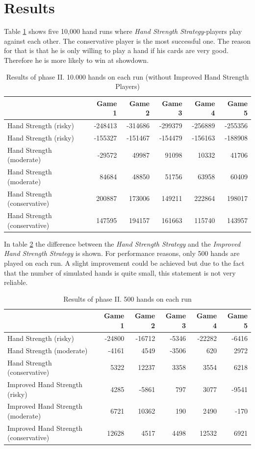 \section{Results}
Table \ref{tbl:resultsPhase2a} shows five 10,000 hand runs where \emph{Hand Strength Strategy}-players play against each other. The conservative player is the most successful one. The reason for that is that he is only willing to play a hand if his cards are very good. Therefore he is more likely to win at showdown.
\begin{table}[h]
	\centering
	\begin{tabular}[h]{l|r|r|r|r|r}
		& \textbf{Game 1} & \textbf{Game 2} & \textbf{Game 3} & \textbf{Game 4} & \textbf{Game 5}\\
		\hline
		Hand Strength (risky) & -248413 & -314686 & -299379 & -256889 & -255356\\
		Hand Strength (risky) & -155327 & -151467 & -154479 & -156163 & -188908\\
		Hand Strength (moderate) & -29572 & 49987 & 91098 & 10332 & 41706\\
		Hand Strength (moderate) & 84684 & 48850 & 51756 & 63958 & 60409\\
		Hand Strength (conservative) & 200887 & 173006 & 149211 & 222864 & 198017\\
		Hand Strength (conservative) & 147595 & 194157 & 161663 & 115740 & 143957\\
	\end{tabular}
	\caption{Results of phase II. 10.000 hands on each run (without Improved Hand Strength Players)}
	\label{tbl:resultsPhase2a}
\end{table}

In table \ref{tbl:resultsPhase2b} the difference between the \emph{Hand Strength Strategy} and the \emph{Improved Hand Strength Strategy} is shown. For performance reasons, only 500 hands are played on each run. A slight improvement could be achieved but due to the fact that the number of simulated hands is quite small, this statement is not very reliable.
\begin{table}[h]
	\centering
	\begin{tabular}[h]{l|r|r|r|r|r}
		& \textbf{Game 1} & \textbf{Game 2} & \textbf{Game 3} & \textbf{Game 4} & \textbf{Game 5}\\
		\hline
		Hand Strength (risky) & -24800 & -16712 & -5346 & -22282 & -6416\\
		Hand Strength (moderate) & -4161 & 4549 & -3506 & 620 & 2972\\
		Hand Strength (conservative) & 5322 & 12237 & 3358 & 3554 & 6218\\
		Improved Hand Strength (risky) & 4285 & -5861 & 797 & 3077 & -9541\\
		Improved Hand Strength (moderate) & 6721 & 10362 & 190 & 2490 & -170\\
		Improved Hand Strength (conservative) & 12628 & 4517 & 4498 & 12532 & 6921\\
	\end{tabular}
	\caption{Results of phase II. 500 hands on each run}
	\label{tbl:resultsPhase2b}
\end{table}

